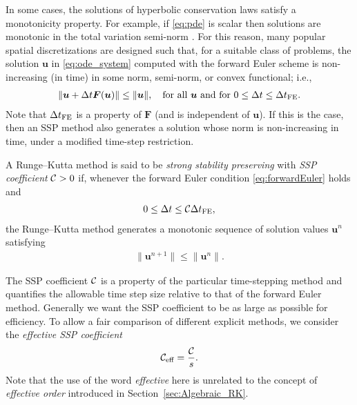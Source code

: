 In some cases, the solutions of hyperbolic conservation laws satisfy a 
monotonicity property. For example, if \eqref{eq:pde} is scalar then solutions 
are monotonic in the total variation semi-norm \cite{Ketcheson2008}.
For this reason, many popular spatial discretizations are designed such 
that, for a suitable class of problems, the solution $\bm{u}$ in 
\eqref{eq:ode_system} computed with the forward Euler scheme is
non-increasing (in time) in some norm, semi-norm, or convex functional; i.e.,
\begin{align}\label{eq:forwardEuler}
    \|\bm{u} + \Delta t\bm{F}(\bm{u})\| \le \|\bm{u}\|, \quad \text{for all } \bm{u} \text{ and for } 0 \le \Delta t \le \Delta t_{\textnormal{FE}}.
\end{align}
Note that $\Delta t_{\textnormal{FE}}$ is a property of $\bm{F}$ (and is independent of $\bm{u}$).
If this is the case, then an SSP method also generates a solution whose norm is
non-increasing in time, under a modified time-step restriction.
\begin{definition}
	A Runge--Kutta method is said to be \emph{strong stability preserving} with
	\emph{SSP coefficient} $\mathcal{C} > 0$ if, whenever the forward Euler condition
	\eqref{eq:forwardEuler} holds and 
	\begin{align*}
		0 \leq \Delta t \leq \mathcal{C} \Delta t_{\textnormal{FE}},
	\end{align*}
	the Runge--Kutta method generates a monotonic sequence of solution values $\bm{u}^n$ satisfying
	\begin{align*}
  		\|\bm{u}^{n+1}\| \le \|\bm{u}^n\|.
	\end{align*}
\end{definition}

The SSP coefficient $\mathcal{C}$ is a property of the particular
time-stepping method and quantifies the allowable time step size relative 
to that of the forward Euler method.
Generally we want the SSP coefficient to be as large as possible for efficiency.
To allow a fair comparison of different explicit methods, we consider the 
\emph{effective SSP coefficient}
\begin{align*}
	\mathcal{C}_{\text{eff}} = \frac{\mathcal{C}}{s}.
\end{align*}
Note that the use of the word \emph{effective} here is unrelated to the 
concept of \emph{effective order} introduced in Section~\ref{sec:Algebraic_RK}.


